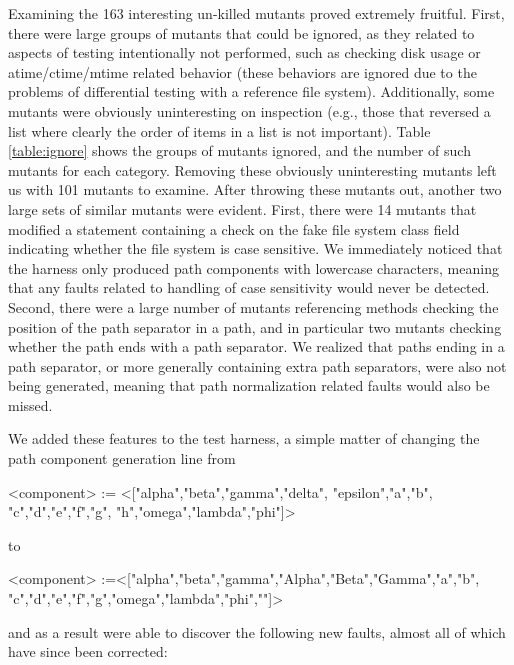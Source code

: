 \documentclass{svjour3}
\begin{document}
Examining the 163 interesting un-killed mutants proved extremely fruitful.
First, there were large groups of mutants that could be ignored, as
they related to aspects of testing intentionally not performed, such
as checking disk usage or atime/ctime/mtime related behavior (these
behaviors are ignored due to the problems of differential testing with
a reference file system).  Additionally, some mutants were obviously
uninteresting on inspection (e.g., those that reversed a list where
clearly the order of items in a list is not important).  Table
\ref{table:ignore} shows the groups of mutants ignored, and the number
of such mutants for each category.  Removing these obviously
uninteresting mutants left us with 101 mutants to examine.  After
throwing these mutants out, another two large sets of similar mutants
were evident.  First, there were 14 mutants that modified a statement
containing a check on the fake file system class field indicating
whether the file system is case sensitive.  We immediately noticed
that the harness only produced path components with lowercase
characters, meaning that any faults related to handling of  case
sensitivity would never be detected.  Second, there were a large
number of mutants referencing methods checking the position of the
path separator in a path, and in particular two mutants checking
whether the path ends with a path separator.  We realized that paths
ending in a path separator, or more generally containing extra path
separators, were also not being generated, meaning that path
normalization related faults would also be missed.

We added these features to the test harness, a simple matter of
changing the path component generation line from

\begin{code}
<component> := <["alpha","beta","gamma","delta", "epsilon","a","b",
   "c","d","e","f","g", "h","omega","lambda","phi"]>
\end{code}

\noindent to

\begin{code}
<component> :=<["alpha","beta","gamma","Alpha","Beta","Gamma","a","b",
   "c","d","e","f","g","omega","lambda","phi",""]>
\end{code}

\noindent and as a result were able
to discover the following new faults, almost all of which have since
been corrected:
\end{document}
